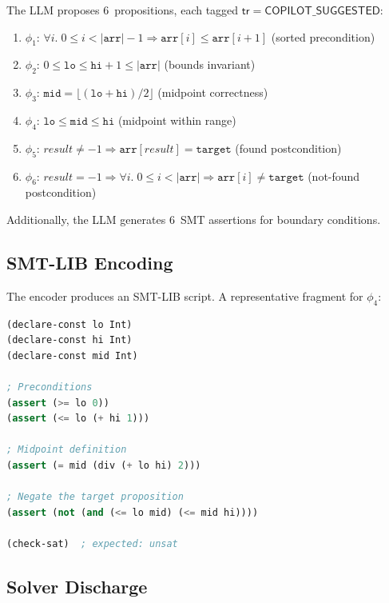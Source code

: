 \documentclass[11pt]{article}
\newcommand{\CopilotSugg}{\ensuremath{\mathsf{COPILOT\_SUGGESTED}}}
\newcommand{\tr}{\mathsf{tr}}                        %
\begin{document}
The LLM proposes 6~propositions, each tagged $\tr = \CopilotSugg$:
\begin{enumerate}[noitemsep]
  \item $\phi_1$: $\forall i.\; 0 \le i < |\mathtt{arr}| - 1 \Rightarrow
        \mathtt{arr}[i] \le \mathtt{arr}[i+1]$ \hfill (sorted precondition)
  \item $\phi_2$: $0 \le \mathtt{lo} \le \mathtt{hi} + 1 \le |\mathtt{arr}|$
        \hfill (bounds invariant)
  \item $\phi_3$: $\mathtt{mid} = \lfloor (\mathtt{lo} + \mathtt{hi}) / 2 \rfloor$
        \hfill (midpoint correctness)
  \item $\phi_4$: $\mathtt{lo} \le \mathtt{mid} \le \mathtt{hi}$
        \hfill (midpoint within range)
  \item $\phi_5$: $\mathit{result} \ne -1 \Rightarrow
        \mathtt{arr}[\mathit{result}] = \mathtt{target}$
        \hfill (found postcondition)
  \item $\phi_6$: $\mathit{result} = -1 \Rightarrow
        \forall i.\; 0 \le i < |\mathtt{arr}| \Rightarrow
        \mathtt{arr}[i] \ne \mathtt{target}$
        \hfill (not-found postcondition)
\end{enumerate}
Additionally, the LLM generates 6~SMT assertions for boundary conditions.

\subsection{SMT-LIB Encoding}

The encoder produces an SMT-LIB script.  A representative fragment for
$\phi_4$:

\begin{lstlisting}[language=lisp,basicstyle=\ttfamily\small]
(declare-const lo Int)
(declare-const hi Int)
(declare-const mid Int)

; Preconditions
(assert (>= lo 0))
(assert (<= lo (+ hi 1)))

; Midpoint definition
(assert (= mid (div (+ lo hi) 2)))

; Negate the target proposition
(assert (not (and (<= lo mid) (<= mid hi))))

(check-sat)  ; expected: unsat
\end{lstlisting}

\subsection{Solver Discharge}
\end{document}
